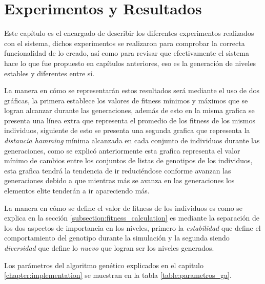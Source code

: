 \chapter{Experimentos y Resultados}
\label{chapter:experiments-and-results}

Este capítulo es el encargado de describir los diferentes experimentos
realizados con el sistema, dichos experimentos se realizaron para comprobar la
correcta funcionalidad de lo creado, así como para revisar que efectivamente el
sistema hace lo que fue propuesto en capítulos anteriores, eso es la generación
de niveles estables y diferentes entre sí.

La manera en cómo se representarán estos resultados será mediante el uso de dos
gráficas, la primera establece los valores de fitness mínimos y máximos que se
logran alcanzar durante las generaciones, además de esto en la misma grafica se
presenta una línea extra que representa el promedio de los fitness de los mismos
individuos, siguiente de esto se presenta una segunda grafica que representa la
\textit{distancia hamming} mínima alcanzada en cada conjunto de individuos
durante las generaciones, como se explicó anteriormente esta grafica representa
el valor mínimo de cambios entre los conjuntos de listas de genotipos de los
individuos, esta grafica tendrá la tendencia de ir reduciéndose conforme avanzan
las generaciones debido a que mientras más se avanza en las generaciones los
elementos elite tenderán a ir apareciendo más.

La manera en cómo se define el valor de fitness de los individuos es como se
explica en la sección \ref{subsection:fitness_calculation} es mediante la
separación de los dos aspectos de importancia en los niveles, primero la
\textit{estabilidad} que define el comportamiento del genotipo durante la
simulación y la segunda siendo \textit{diversidad} que define lo \textit{nuevo}
que logran ser los niveles generados.

Los parámetros del algoritmo genético explicados en el capitulo
\ref{chapter:implementation} se muestran en la tabla \ref{table:parametros_ga}.

